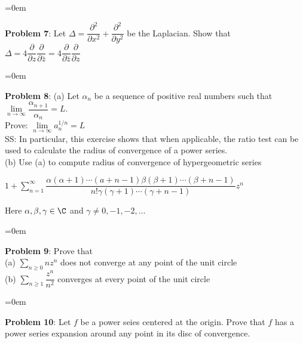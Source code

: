 \documentclass{article}
\begin{document}
\parskip=0em
\begin{mdframed}[backgroundcolor=blue!20]
\textbf{Problem 7}: Let $\Delta = \dfrac{\partial^2}{\partial x^2} + \dfrac{\partial^2}{\partial y^2}$ be the Laplacian. Show that $\Delta = 4\dfrac{\partial}{\partial z}\dfrac{\partial}{\partial \bar{z}} = 4 \dfrac{\partial}{\partial \bar{z}}\dfrac{\partial}{\partial z}$
\end{mdframed}


\parskip=0em
\begin{mdframed}[backgroundcolor=blue!20]
\textbf{Problem 8}: (a) Let $\alpha_n$ be a sequence of positive real numbers such that $\lim\limits_{n\to \infty} \dfrac{\alpha_{n+1}}{\alpha_n} = L.$\\ Prove: $\lim\limits_{n \to \infty} a_n^{1/n} = L$\\
SS: In particular, this exercise shows that when applicable, the ratio test can be used to calculate the radius of convergence of a power series.\\
(b) Use (a) to compute radius of convergence of hypergeometric series 
\begin{center}
    $1 + \sum\limits_{n = 1}^\infty \dfrac{\alpha(\alpha + 1)\cdots(a + n-1)\beta(\beta + 1)\cdots(\beta + n-1)}{n!\gamma(\gamma + 1)\cdots(\gamma + n - 1)}z^n$
\end{center}
Here $\alpha, \beta, \gamma \in \C$ and $\gamma \neq 0, -1, -2, \ldots$
\end{mdframed}


\parskip=0em
\begin{mdframed}[backgroundcolor=blue!20]
\textbf{Problem 9}: Prove that\\
(a) $\sum\limits_{n \geq 0} nz^n$ does not converge at any point of the unit circle\\
(b) $\sum\limits_{n\geq 1}\dfrac{z^n}{n^2}$ converges at every point of the unit circle
\end{mdframed}


\parskip=0em
\begin{mdframed}[backgroundcolor=blue!20]
\textbf{Problem 10}: Let $f$ be a power seies centered at the origin. Prove that $f$ has a power series expansion around any point in its disc of convergence.
\end{mdframed}
\end{document}

